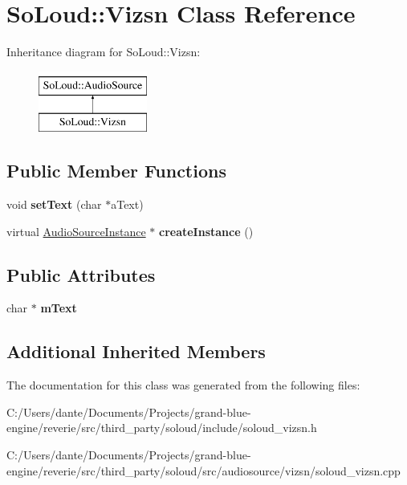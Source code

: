 \hypertarget{class_so_loud_1_1_vizsn}{}\section{So\+Loud\+::Vizsn Class Reference}
\label{class_so_loud_1_1_vizsn}
Inheritance diagram for So\+Loud\+::Vizsn\+:\begin{figure}[H]
\begin{center}
\leavevmode
\includegraphics[height=2.000000cm]{class_so_loud_1_1_vizsn}
\end{center}
\end{figure}
\subsection*{Public Member Functions}
\begin{DoxyCompactItemize}
\item 
\mbox{\label{class_so_loud_1_1_vizsn_a46b594e33d5d85a21bb552258a61862a}} 
void {\bfseries set\+Text} (char $\ast$a\+Text)
\item 
\mbox{\label{class_so_loud_1_1_vizsn_aec00102972cc1647048524b1104233fe}} 
virtual \mbox{\hyperlink{class_so_loud_1_1_audio_source_instance}{Audio\+Source\+Instance}} $\ast$ {\bfseries create\+Instance} ()
\end{DoxyCompactItemize}
\subsection*{Public Attributes}
\begin{DoxyCompactItemize}
\item 
\mbox{\label{class_so_loud_1_1_vizsn_a1cdaf13edf387087ab4c49ff9381c9be}} 
char $\ast$ {\bfseries m\+Text}
\end{DoxyCompactItemize}
\subsection*{Additional Inherited Members}


The documentation for this class was generated from the following files\+:\begin{DoxyCompactItemize}
\item 
C\+:/\+Users/dante/\+Documents/\+Projects/grand-\/blue-\/engine/reverie/src/third\+\_\+party/soloud/include/soloud\+\_\+vizsn.\+h\item 
C\+:/\+Users/dante/\+Documents/\+Projects/grand-\/blue-\/engine/reverie/src/third\+\_\+party/soloud/src/audiosource/vizsn/soloud\+\_\+vizsn.\+cpp\end{DoxyCompactItemize}
